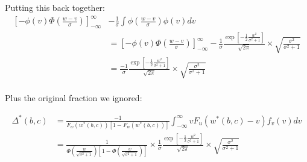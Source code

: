 \documentclass{article}
\begin{document}
Putting this back together:
\begin{align*}
 \left[
        -\phi(v) \Phi\left(\frac{w-v}{\sigma}\right) 
    \right]^\infty_{-\infty} &-\frac{1}{\sigma} \int \phi\left(\frac{w - v}{\sigma}\right) \phi(v) dv  
     \\
    &=
 \left[
        -\phi(v) \Phi\left(\frac{w-v}{\sigma}\right) 
    \right]^\infty_{-\infty} -
    \frac{1}{\sigma} \frac{
        \exp \left[
            -\frac{1}{2}\frac{w^2}{\sigma^2 + 1}
        \right]
    }{\sqrt{2\pi}} \times 
                    \sqrt{
                        \frac{\sigma^2}{\sigma^2 + 1}
                    }  \\
&=
    \frac{-1}{\sigma} \frac{
        \exp \left[
            -\frac{1}{2}\frac{w^2}{\sigma^2 + 1}
        \right]
    }{\sqrt{2\pi}} \times 
                    \sqrt{
                        \frac{\sigma^2}{\sigma^2 + 1}
                    }  \\
\end{align*}


Plus the original fraction we ignored:

\begin{align*}
    \Delta^*(b,c) &= \frac{
        -1
    }{
        F_w(w^*(b,c)) [1 - F_w(w^*(b,c))]
    } \int^\infty_{-\infty} vF_u(w^*(b,c) - v) f_v(v) dv \\
     &= 
\frac{
        1
    }{
        \Phi\left(\frac{w}{\sqrt{\sigma^2 + 1}}\right)
         \left[1 - \Phi\left(\frac{
            w
        }{
            \sqrt{\sigma^2 + 1}
        }\right)\right]
    } \times 
    \frac{1}{\sigma} \frac{
        \exp \left[
            -\frac{1}{2}\frac{w^2}{\sigma^2 + 1}
        \right]
    }{\sqrt{2\pi}} \times 
                    \sqrt{
                        \frac{\sigma^2}{\sigma^2 + 1}
                    }  \\
\end{align*}
\end{document}
